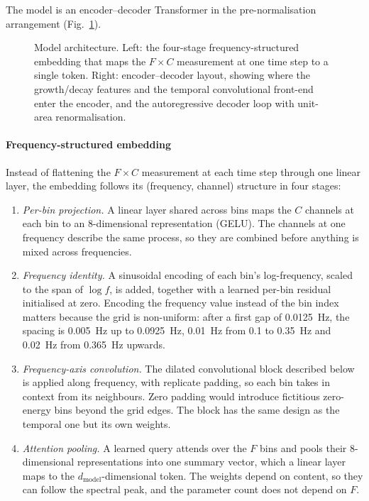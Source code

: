 The model is an encoder--decoder Transformer \citep{vaswani2017attention} in the pre-normalisation arrangement \citep{xiong2020prenorm} (Fig.~\ref{fig:architecture}).
 
\begin{figure}[t]
  \centering
  \caption{Model architecture. Left: the four-stage frequency-structured embedding that maps the $F \times C$ measurement at one time step to a single token. Right: encoder--decoder layout, showing where the growth/decay features and the temporal convolutional front-end enter the encoder, and the autoregressive decoder loop with unit-area renormalisation.}
  \label{fig:architecture}
\end{figure}

\paragraph{Frequency-structured embedding}
Instead of flattening the $F \times C$ measurement at each time step through one linear layer, the embedding follows its (frequency, channel) structure in four stages:
\begin{enumerate}
  \item \emph{Per-bin projection.} A linear layer shared across bins maps the $C$ channels at each bin to an 8-dimensional representation (GELU). The channels at one frequency describe the same process, so they are combined before anything is mixed across frequencies.
  \item \emph{Frequency identity.} A sinusoidal encoding of each bin's log-frequency, scaled to the span of $\log f$, is added, together with a learned per-bin residual initialised at zero. Encoding the frequency value instead of the bin index matters because the grid is non-uniform: after a first gap of 0.0125~Hz, the spacing is 0.005~Hz up to 0.0925~Hz, 0.01~Hz from 0.1 to 0.35~Hz and 0.02~Hz from 0.365~Hz upwards.
  \item \emph{Frequency-axis convolution.} The dilated convolutional block described below is applied along frequency, with replicate padding, so each bin takes in context from its neighbours. Zero padding would introduce fictitious zero-energy bins beyond the grid edges. The block has the same design as the temporal one but its own weights.
  \item \emph{Attention pooling.} A learned query attends over the $F$ bins and pools their 8-dimensional representations into one summary vector, which a linear layer maps to the $d_{\text{model}}$-dimensional token. The weights depend on content, so they can follow the spectral peak, and the parameter count does not depend on $F$.
\end{enumerate}

